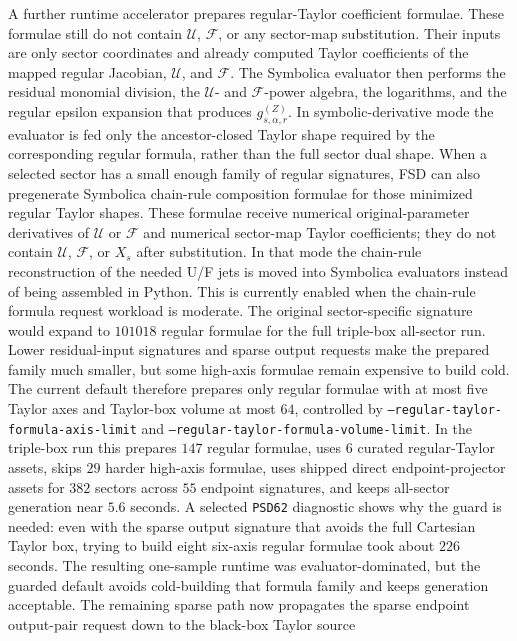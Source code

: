 \documentclass[11pt]{article}
\newcommand{\U}{\mathcal U}
\newcommand{\F}{\mathcal F}
\begin{document}
A further runtime accelerator prepares regular-Taylor coefficient formulae.
These formulae still do not contain \(\U\), \(\F\), or any sector-map
substitution.  Their inputs are only sector coordinates and already computed
Taylor coefficients of the mapped regular Jacobian, \(\U\), and \(\F\).  The
Symbolica evaluator then performs the residual monomial division, the
\(\U\)- and \(\F\)-power algebra, the logarithms, and the regular epsilon
expansion that produces \(g_{s,\alpha,r}^{(Z)}\).  In symbolic-derivative mode
the evaluator is fed only the ancestor-closed Taylor shape required by the
corresponding regular formula, rather than the full sector dual shape.  When a
selected sector has a small enough family of regular signatures, FSD can also
pregenerate Symbolica chain-rule composition formulae for those minimized
regular Taylor shapes.  These formulae receive numerical original-parameter
derivatives of \(\U\) or \(\F\) and numerical sector-map Taylor coefficients;
they do not contain \(\U\), \(\F\), or \(X_s\) after substitution.  In that
mode the chain-rule reconstruction of the needed U/F jets is moved into
Symbolica evaluators instead of being assembled in Python.  This is currently
enabled when the chain-rule formula request workload is moderate.  The
original sector-specific signature would expand to \(101018\) regular formulae
for the full triple-box all-sector run.  Lower residual-input signatures and
sparse output requests make the prepared family much smaller, but some
high-axis formulae remain expensive to build cold.  The current default
therefore prepares only regular formulae with at most five Taylor axes and
Taylor-box volume at most \(64\), controlled by
\texttt{--regular-taylor-formula-axis-limit} and
\texttt{--regular-taylor-formula-volume-limit}.  In the triple-box run this
prepares \(147\) regular formulae, uses \(6\) curated regular-Taylor assets,
skips \(29\) harder high-axis formulae, uses shipped direct endpoint-projector
assets for \(382\) sectors across \(55\) endpoint signatures, and keeps
all-sector generation near \(5.6\) seconds.  A selected \texttt{PSD62}
diagnostic shows why the guard is needed: even with the sparse output signature
that avoids the full Cartesian Taylor box, trying to build eight six-axis
regular formulae took about \(226\) seconds.  The resulting one-sample runtime
was evaluator-dominated, but the guarded default avoids cold-building that
formula family and keeps generation acceptable.  The remaining sparse path now propagates
the sparse endpoint output-pair request down to the black-box Taylor source
\end{document}
